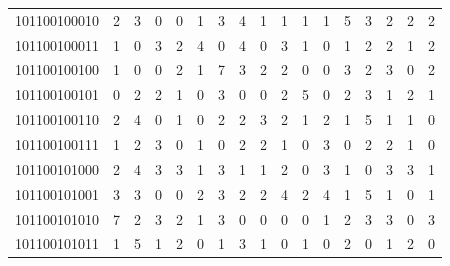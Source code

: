 \documentclass[10pt,a4paper]{article}
\begin{document}
\begin{longtable}{ |c|c|c|c|c|c|c|c|c|c|c|c|c|c|c|c|c| }
    101100100010              & 2                            & 3                                & 0                            & 0                              & 1   & 3   & 4   & 1   & 1   & 1   & 1   & 5   & 3   & 2   & 2   & 2   \\
    101100100011              & 1                            & 0                                & 3                            & 2                              & 4   & 0   & 4   & 0   & 3   & 1   & 0   & 1   & 2   & 2   & 1   & 2   \\
    101100100100              & 1                            & 0                                & 0                            & 2                              & 1   & 7   & 3   & 2   & 2   & 0   & 0   & 3   & 2   & 3   & 0   & 2   \\
    101100100101              & 0                            & 2                                & 2                            & 1                              & 0   & 3   & 0   & 0   & 2   & 5   & 0   & 2   & 3   & 1   & 2   & 1   \\
    101100100110              & 2                            & 4                                & 0                            & 1                              & 0   & 2   & 2   & 3   & 2   & 1   & 2   & 1   & 5   & 1   & 1   & 0   \\
    101100100111              & 1                            & 2                                & 3                            & 0                              & 1   & 0   & 2   & 2   & 1   & 0   & 3   & 0   & 2   & 2   & 1   & 0   \\
    101100101000              & 2                            & 4                                & 3                            & 3                              & 1   & 3   & 1   & 1   & 2   & 0   & 3   & 1   & 0   & 3   & 3   & 1   \\
    101100101001              & 3                            & 3                                & 0                            & 0                              & 2   & 3   & 2   & 2   & 4   & 2   & 4   & 1   & 5   & 1   & 0   & 1   \\
    101100101010              & 7                            & 2                                & 3                            & 2                              & 1   & 3   & 0   & 0   & 0   & 0   & 1   & 2   & 3   & 3   & 0   & 3   \\
    101100101011              & 1                            & 5                                & 1                            & 2                              & 0   & 1   & 3   & 1   & 0   & 1   & 0   & 2   & 0   & 1   & 2   & 0   \\

\end{longtable}
\end{document}
